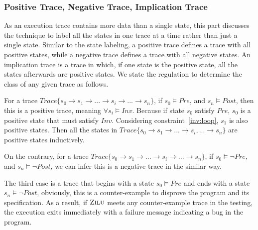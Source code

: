 \subsubsection*{Positive Trace, Negative Trace, Implication Trace}
As an execution trace contains more data than a single state,
this part discusses the technique to label all the states in one trace at a time rather than just a single state.
Similar to the state labeling, a positive trace defines a trace with all positive states,
while a negative trace defines a trace with all negative states.
An implication trace is a trace in which, if one state is the positive state, 
all the states afterwards are positive states.
We state the regulation to determine the class of any given trace as follows.

For a trace $Trace\{s_0 \to s_1 \to ... \to s_i \to ... \to s_n\}$, 
if $s_0 \models Pre$, and $s_n \models Post$,
then this is a positive trace, meaning $\forall s_i \models Inv$.
Because if state $s_0$ satisfy $Pre$,
$s_0$ is a positive state that must satisfy $Inv$. %
Considering constraint~\ref{inv:loop}, $s_1$ is also positive states.
Then all the states in $Trace\{s_0 \to s_1 \to ...\to s_i, ... \to s_n\}$ are positive states inductively. 

On the contrary, for a trace $Trace\{s_0 \to s_1 \to ...\to s_i \to ... \to s_n\}$, 
if $s_0 \models \neg Pre$, and $s_n \models \neg Post$,
we can infer this is a negative trace in the similar way. 


The third case is a trace that begins with a state $s_0 \models Pre$ and ends with a state $s_n \models \neg Post$,
obviously, this is a counter-example to disprove the program and its specification.
As a result, if $\textsc{Zilu}$ meets any counter-example trace in the testing, 
the execution exits immediately with a failure message indicating a bug in the program. 

